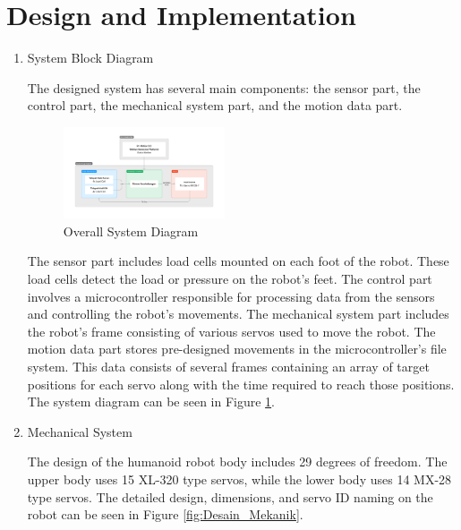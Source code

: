\newpage
\section{Design and Implementation}
\label{sec:designandimplementation}

\begin{enumerate}[label=\Alph*.]
    \item System Block Diagram
    \label{subsec:systemblockdiagram}

    \hspace*{1em} The designed system has several main components: the sensor part, the control part, the mechanical system part, and the motion data part.

    \begin{figure} [h] \centering
        \includegraphics[width=0.45\textwidth]{gambar/Diagram_Sistem.png}
        \caption{Overall System Diagram}
        \label{fig:Diagram_Sistem}
    \end{figure}
    
    \hspace*{1em} The sensor part includes load cells mounted on each foot of the robot. These load cells detect the load or pressure on the robot's feet. The control part involves a microcontroller responsible for processing data from the sensors and controlling the robot's movements. The mechanical system part includes the robot's frame consisting of various servos used to move the robot. The motion data part stores pre-designed movements in the microcontroller's file system. This data consists of several frames containing an array of target positions for each servo along with the time required to reach those positions. The system diagram can be seen in Figure \ref{fig:Diagram_Sistem}.

    \item Mechanical System
    \label{subsec:mechanicalsystem}

    \hspace*{1em} The design of the humanoid robot body includes 29 degrees of freedom. The upper body uses 15 XL-320 type servos, while the lower body uses 14 MX-28 type servos. The detailed design, dimensions, and servo ID naming on the robot can be seen in Figure \ref{fig:Desain_Mekanik}. 


\end{enumerate}
